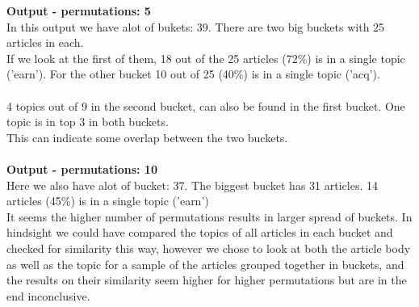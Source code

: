 \documentclass{article}
\begin{document}
\textbf{Output - permutations: 5}\\
In this output we have alot of bukets: 39. There are two big buckets with 25 articles in each. ~\\
If we look at the first of them, 18 out of the 25 articles (72\%) is in a single topic ('earn'). For the other bucket 10 out of 25 (40\%) is in a single topic ('acq'). \\
~\\
4 topics out of 9 in the second bucket, can also be found in the first bucket. One topic is in top 3 in both buckets. ~\\
This can indicate some overlap between the two buckets. \\
~\\
\textbf{Output - permutations: 10}\\
Here we also have alot of bucket: 37. The biggest bucket has 31 articles. 
14 articles (45\%) is in a single topic ('earn')
~\\

It seems the higher number of permutations results in larger spread of buckets.
In hindsight we could have compared the topics of all articles in each bucket and checked for similarity this way, however we chose to look at both the article body as well as the topic for a sample of the articles grouped together in buckets, and the results on their similarity seem higher for higher permutations but are in the end inconclusive.
\end{document}
